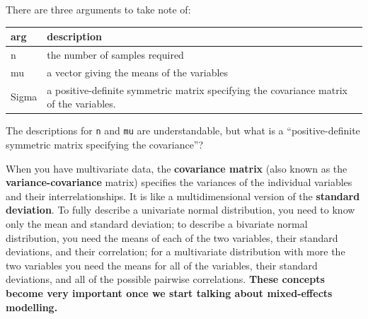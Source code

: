 \documentclass[]{book}
\begin{document}
There are three arguments to take note of:

\begin{longtable}[]{@{}ll@{}}
\toprule
\begin{minipage}[b]{0.06\columnwidth}\raggedright
arg\strut
\end{minipage} & \begin{minipage}[b]{0.88\columnwidth}\raggedright
description\strut
\end{minipage}\tabularnewline
\midrule
\endhead
\begin{minipage}[t]{0.06\columnwidth}\raggedright
n\strut
\end{minipage} & \begin{minipage}[t]{0.88\columnwidth}\raggedright
the number of samples required\strut
\end{minipage}\tabularnewline
\begin{minipage}[t]{0.06\columnwidth}\raggedright
mu\strut
\end{minipage} & \begin{minipage}[t]{0.88\columnwidth}\raggedright
a vector giving the means of the variables\strut
\end{minipage}\tabularnewline
\begin{minipage}[t]{0.06\columnwidth}\raggedright
Sigma\strut
\end{minipage} & \begin{minipage}[t]{0.88\columnwidth}\raggedright
a positive-definite symmetric matrix specifying the covariance matrix of the variables.\strut
\end{minipage}\tabularnewline
\bottomrule
\end{longtable}

The descriptions for \texttt{n} and \texttt{mu} are understandable, but what is a ``positive-definite symmetric matrix specifying the covariance''?

When you have multivariate data, the \textbf{covariance matrix} (also known as the \textbf{variance-covariance} matrix) specifies the variances of the individual variables and their interrelationships. It is like a multidimensional version of the \textbf{standard deviation}. To fully describe a univariate normal distribution, you need to know only the mean and standard deviation; to describe a bivariate normal distribution, you need the means of each of the two variables, their standard deviations, and their correlation; for a multivariate distribution with more the two variables you need the means for all of the variables, their standard deviations, and all of the possible pairwise correlations. \textbf{These concepts become very important once we start talking about mixed-effects modelling.}
\end{document}
